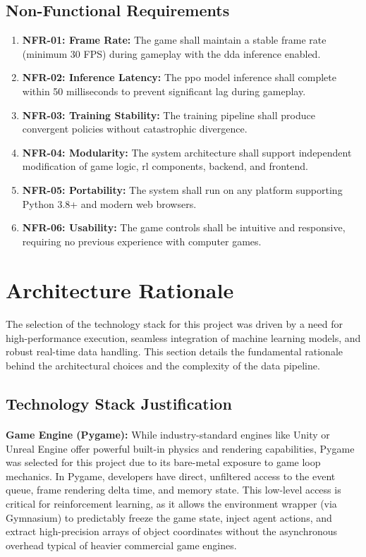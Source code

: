\subsection{Non-Functional Requirements}
\begin{enumerate}
	\item \textbf{NFR-01: Frame Rate:} The game shall maintain a stable frame rate (minimum 30 FPS) during gameplay with the \ac{dda} inference enabled.
	\item \textbf{NFR-02: Inference Latency:} The \ac{ppo} model inference shall complete within 50 milliseconds to prevent significant lag during gameplay.
	\item \textbf{NFR-03: Training Stability:} The training pipeline shall produce convergent policies without catastrophic divergence.
	\item \textbf{NFR-04: Modularity:} The system architecture shall support independent modification of game logic, \ac{rl} components, backend, and frontend.
	\item \textbf{NFR-05: Portability:} The system shall run on any platform supporting Python 3.8+ and modern web browsers.
	\item \textbf{NFR-06: Usability:} The game controls shall be intuitive and responsive, requiring no previous experience with computer games.
\end{enumerate}

\section{Architecture Rationale}
\paragraph{} The selection of the technology stack for this project was driven by a need for high-performance execution, seamless integration of machine learning models, and robust real-time data handling. This section details the fundamental rationale behind the architectural choices and the complexity of the data pipeline.

\subsection{Technology Stack Justification}
\paragraph{} \textbf{Game Engine (Pygame):} While industry-standard engines like Unity or Unreal Engine offer powerful built-in physics and rendering capabilities, Pygame was selected for this project due to its bare-metal exposure to game loop mechanics. In Pygame, developers have direct, unfiltered access to the event queue, frame rendering delta time, and memory state. This low-level access is critical for reinforcement learning, as it allows the environment wrapper (via Gymnasium) to predictably freeze the game state, inject agent actions, and extract high-precision arrays of object coordinates without the asynchronous overhead typical of heavier commercial game engines.
